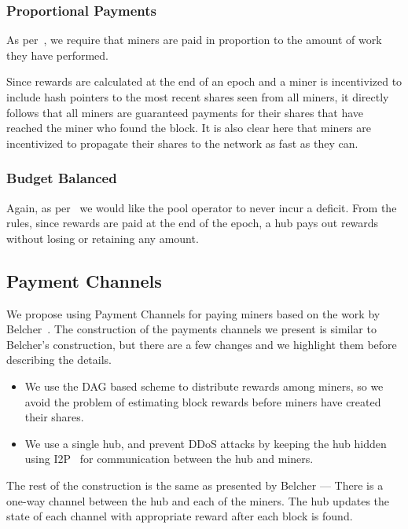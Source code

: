 \documentclass{article}
\begin{document}
\subsubsection{Proportional Payments}\label{sec:proportional-payments}

As per~\cite{incentives-compatible}, we require that miners are paid
in proportion to the amount of work they have performed.

Since rewards are calculated at the end of an epoch and a miner is
incentivized to include hash pointers to the most recent shares seen
from all miners, it directly follows that all miners are guaranteed
payments for their shares that have reached the miner who found the
block. It is also clear here that miners are incentivized to propagate
their shares to the network as fast as they can.

\subsubsection{Budget Balanced}\label{sec:budget-balanced}

Again, as per~\cite{incentives-compatible} we would like the pool
operator to never incur a deficit. From the rules, since rewards are
paid at the end of the epoch, a hub pays out rewards without losing or
retaining any amount.

\subsection{Payment Channels}\label{ref:channels}

We propose using Payment Channels for paying miners based on the work
by Belcher~\cite{channels-for-rewards}. The construction of the
payments channels we present is similar to Belcher's construction, but
there are a few changes and we highlight them before describing the
details.

\begin{itemize}
\item We use the DAG based scheme to distribute rewards among miners,
  so we avoid the problem of estimating block rewards before miners
  have created their shares.
\item We use a single hub, and prevent DDoS attacks by keeping the hub
  hidden using I2P~\cite{i2p, i2p-censorship-resistance} for
  communication between the hub and miners.
\end{itemize}

The rest of the construction is the same as presented by Belcher ---
There is a one-way channel between the hub and each of the miners. The
hub updates the state of each channel with appropriate reward after
each block is found.
\end{document}
